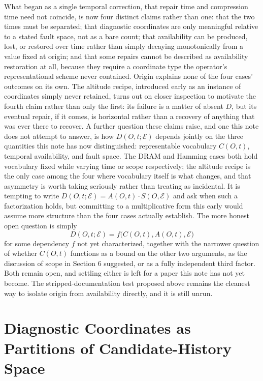 \documentclass[11pt]{article}
\begin{document}
What began as a single temporal correction, that repair time and compression time need not coincide, is now four distinct claims rather than one: that the two times must be separated; that diagnostic coordinates are only meaningful relative to a stated fault space, not as a bare count; that availability can be produced, lost, or restored over time rather than simply decaying monotonically from a value fixed at origin; and that some repairs cannot be described as availability restoration at all, because they require a coordinate type the operator's representational scheme never contained. Origin explains none of the four cases' outcomes on its own. The altitude recipe, introduced early as an instance of coordinates simply never retained, turns out on closer inspection to motivate the fourth claim rather than only the first: its failure is a matter of absent $D$, but its eventual repair, if it comes, is horizontal rather than a recovery of anything that was ever there to recover. A further question these claims raise, and one this note does not attempt to answer, is how $D(O,t;\mathcal{E})$ depends jointly on the three quantities this note has now distinguished: representable vocabulary $C(O,t)$, temporal availability, and fault space. The DRAM and Hamming cases both hold vocabulary fixed while varying time or scope respectively; the altitude recipe is the only case among the four where vocabulary itself is what changes, and that asymmetry is worth taking seriously rather than treating as incidental. It is tempting to write $D(O,t;\mathcal{E}) = A(O,t) \cdot S(O,\mathcal{E})$ and ask when such a factorization holds, but committing to a multiplicative form this early would assume more structure than the four cases actually establish. The more honest open question is simply
\[
D(O,t;\mathcal{E}) = f\bigl(C(O,t), A(O,t), \mathcal{E}\bigr)
\]
for some dependency $f$ not yet characterized, together with the narrower question of whether $C(O,t)$ functions as a bound on the other two arguments, as the discussion of scope in Section 6 suggested, or as a fully independent third factor. Both remain open, and settling either is left for a paper this note has not yet become. The stripped-documentation test proposed above remains the cleanest way to isolate origin from availability directly, and it is still unrun.

\appendix
\section{Diagnostic Coordinates as Partitions of Candidate-History Space}
\end{document}
